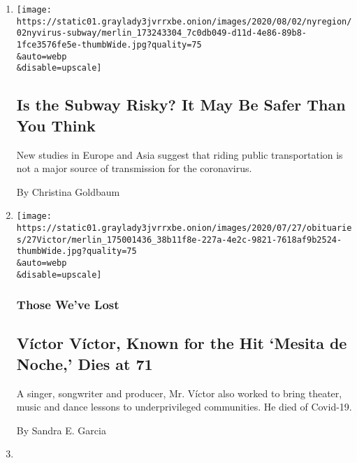 \begin{enumerate}
\def\labelenumi{\arabic{enumi}.}
\item
  \href{/2020/08/02/nyregion/nyc-subway-coronavirus-safety.html}{}

  \texttt{[image: https://static01.graylady3jvrrxbe.onion/images/2020/08/02/nyregion/02nyvirus-subway/merlin\_173243304\_7c0db049-d11d-4e86-89b8-1fce3576fe5e-thumbWide.jpg?quality=75\\\&auto=webp\\\&disable=upscale]}

  \hypertarget{is-the-subway-risky-it-may-be-safer-than-you-think}{%
  \subsection{Is the Subway Risky? It May Be Safer Than You
  Think}\label{is-the-subway-risky-it-may-be-safer-than-you-think}}

  New studies in Europe and Asia suggest that riding public
  transportation is not a major source of transmission for the
  coronavirus.

  By Christina Goldbaum
\item
  \href{/2020/08/01/obituaries/victor-victor-dead-coronavirus.html}{}

  \texttt{[image: https://static01.graylady3jvrrxbe.onion/images/2020/07/27/obituaries/27Victor/merlin\_175001436\_38b11f8e-227a-4e2c-9821-7618af9b2524-thumbWide.jpg?quality=75\\\&auto=webp\\\&disable=upscale]}

  \hypertarget{those-weve-lost}{%
  \subsubsection{Those We've Lost}\label{those-weve-lost}}

  \hypertarget{vuxedctor-vuxedctor-known-for-the-hit-mesita-de-noche-dies-at-71}{%
  \subsection{Víctor Víctor, Known for the Hit `Mesita de Noche,' Dies
  at
  71}\label{vuxedctor-vuxedctor-known-for-the-hit-mesita-de-noche-dies-at-71}}

  A singer, songwriter and producer, Mr. Víctor also worked to bring
  theater, music and dance lessons to underprivileged communities. He
  died of Covid-19.

  By Sandra E. Garcia
\item
  \href{/es/2020/08/01/espanol/opinion/coronavirus-aire.html}{}


\end{enumerate}
